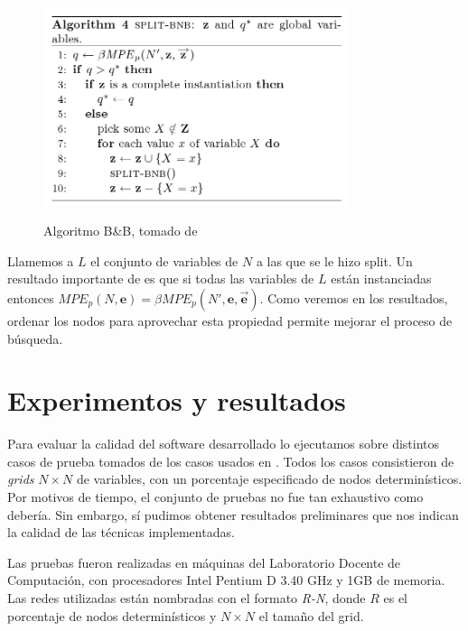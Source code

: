 \documentclass[11pt, letterpaper]{article}
\begin{document}
\begin{figure}
\begin{center}
\includegraphics[width=24em]{splitbnb.png}\\
\caption{Algoritmo B\&B, tomado de \cite{ChoiChaviraDarwiche07}}
\end{center}
\end{figure}

Llamemos a $L$ el conjunto de variables de $N$ a las que se le hizo
split. Un resultado importante de \cite{ChoiChaviraDarwiche07} es que
si todas las variables de $L$ están instanciadas entonces $MPE_p(N,
\mathbf{e}) = \beta MPE_p(N', \mathbf{e}, \vec{\mathbf{e}})$.
Como veremos en los resultados, ordenar los nodos para aprovechar esta propiedad
permite mejorar el proceso de búsqueda.

\section{Experimentos y resultados}

Para evaluar la calidad del software desarrollado lo ejecutamos sobre distintos
casos de prueba tomados de los casos usados en \cite{sangbeamekautzAAAI05}.
Todos los casos consistieron de \emph{grids} $N \times N$ de variables, con un
porcentaje especificado de nodos determinísticos. Por motivos de tiempo, el
conjunto de pruebas no fue tan exhaustivo como debería. Sin embargo, sí pudimos
obtener resultados preliminares que nos indican la calidad de las técnicas
implementadas.

Las pruebas fueron realizadas en máquinas del Laboratorio Docente de
Computación, con procesadores Intel Pentium D 3.40 GHz y 1GB de memoria.
Las redes utilizadas están nombradas con el formato \emph{R-N}, donde $R$ es el
porcentaje de nodos determinísticos y $N \times N$ el tamaño del grid.
\end{document}
